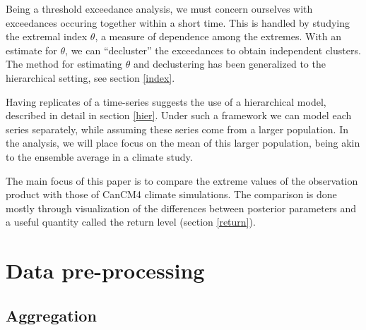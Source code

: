 \documentclass[12pt]{article}
\begin{document}
Being a threshold exceedance analysis, we must concern ourselves with exceedances occuring together within a short time. This is handled by studying the extremal index $\theta$, a measure of dependence among the extremes. With an estimate for $\theta$, we can ``decluster'' the exceedances to obtain independent clusters. The method for estimating $\theta$ and declustering has been generalized to the hierarchical setting, see section \ref{index}.

Having replicates of a time-series suggests the use of a hierarchical model, described in detail in section \ref{hier}. Under such a framework we can model each series separately, while assuming these series come from a larger population. In the analysis, we will place focus on the mean of this larger population, being akin to the ensemble average in a climate study.

The main focus of this paper is to compare the extreme values of the observation product with those of CanCM4 climate simulations. The comparison is done mostly through visualization of the differences between posterior parameters and a useful quantity called the return level (section \ref{return}).



\section{Data pre-processing}
\label{process}

\subsection{Aggregation}
\label{aggregate}
\end{document}
